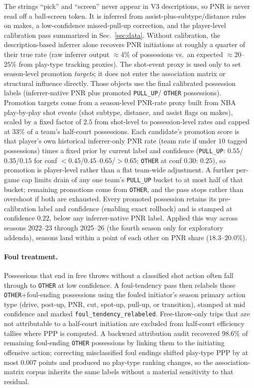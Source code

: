 \documentclass[11pt]{article}
\begin{document}
\noindent
The strings ``pick'' and ``screen'' never appear in V3 descriptions, so PNR is never read
off a ball-screen token. It is inferred from assist-plus-subtype/distance rules on makes,
a low-confidence missed-pull-up correction, and the player-level calibration pass summarized
in Sec.~\ref{sec:data}. Without calibration, the description-based inferrer alone recovers
PNR initiations at roughly a quarter of their true rate (raw inferrer output
$\approx\!4\%$ of possessions vs.\ an expected $\approx\!20$--$25\%$ from play-type tracking
proxies). The shot-event proxy is used only to set season-level promotion \emph{targets}; it
does not enter the association matrix or structural influence directly. Those objects use the
final calibrated possession labels (inferrer-native PNR plus promoted \texttt{PULL\_UP}/
\texttt{OTHER} possessions). Promotion targets come from a season-level PNR-rate proxy built
from NBA play-by-play shot events (shot subtype, distance, and assist flags on makes), scaled
by a fixed factor of $2.5$ from shot-level to possession-level rates and capped at $33\%$ of
a team's half-court possessions. Each candidate's promotion score is that player's own
historical inferrer-only PNR rate (team rate if under $10$ tagged possessions) times a fixed
prior by current label and confidence
(\texttt{PULL\_UP}: $0.55$/$0.35$/$0.15$ for conf $<0.45$/$0.45$--$0.65$/$\!>\!0.65$;
\texttt{OTHER} at conf $0.30$: $0.25$), so promotion is player-level rather than a flat
team-wide adjustment. A further per-game cap limits drain of any one team's \texttt{PULL\_UP}
bucket to at most half of that bucket; remaining promotions come from \texttt{OTHER}, and the
pass stops rather than overshoot if both are exhausted. Every promoted possession retains its
pre-calibration label and confidence (enabling exact rollback) and is stamped at confidence
$0.22$, below any inferrer-native PNR label. Applied this way across seasons 2022--23 through
2025--26 (the fourth season only for exploratory addenda), seasons land within a point of each
other on PNR share ($18.3$--$20.0\%$).

\paragraph*{Foul treatment.}
Possessions that end in free throws without a classified shot action often fall through to
\texttt{OTHER} at low confidence. A foul-tendency pass then relabels those
\texttt{OTHER}+foul-ending possessions using the fouled initiator's season primary action
type (drive, post-up, PNR, cut, spot-up, pull-up, or transition), stamped at mid confidence
and marked \texttt{foul\_tendency\_relabeled}. Free-throw-only trips that are not attributable
to a half-court initiation are excluded from half-court efficiency tallies where PPP is
computed. A backward attribution audit recovered $98.6\%$ of remaining foul-ending
\texttt{OTHER} possessions by linking them to the initiating offensive action; correcting
misclassified foul endings shifted play-type PPP by at most $0.007$ points and produced no
play-type ranking changes, so the association-matrix corpus inherits the same labels without
a material sensitivity to that residual.
\end{document}
